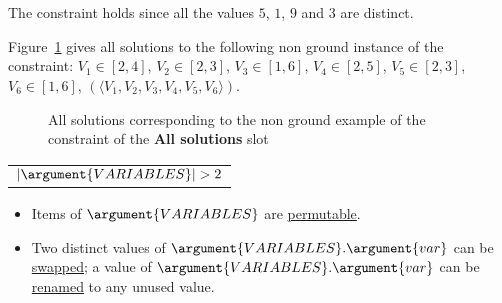 \begin{ctrdesc}
{{{}}}
\\\ \\
The  constraint holds since all the values $5$, $1$, $9$ and $3$
are distinct.

\item[\pdfmarkup{subject={All solutions},color=white,markup=Highlight}{All solutions}{Example of all solutions for a non ground instance of the constraint.}]
Figure~\ref{fig:alldifferent0} gives all solutions to the following non ground instance of the  constraint:
$V_1\in [2,4]$, $V_2\in [2,3]$, $V_3\in [1,6]$, $V_4\in [2,5]$, $V_5\in [2,3]$, $V_6\in [1,6]$,
$(\langle V_1,V_2,V_3,V_4,V_5,V_6\rangle)$.
\begin{figure}[!h]
\centering
{\small
{}
\caption{\label{fig:alldifferent0}
All solutions corresponding to the non ground example of the  constraint of the {\bf All solutions} slot}
}
\end{figure}

\item[\pdfmarkup{subject={Typical},color=white,markup=Highlight}{Typical}{Typical condition on the arguments of the constraint.}]
\colorbox{MyAzurelight}{\begin{minipage}[t]{11.2cm}
\begin{tabular}[t]{l}
$|\argument{VARIABLES}|>2$\\
\end{tabular}

\end{minipage}}
\item[\pdfmarkup{subject={Symmetries},color=white,markup=Highlight}{Symmetries}{List of mappings (e.g., permutation of arguments, permutation of items, permutation of attributes, permutation of values, translation of attributes) that preserve the solutions of the constraint.}]
\colorbox{MyAzurelight}{\begin{minipage}[t]{11.2cm}
\begin{itemize}
\item
Items of $\argument{VARIABLES}$ are \hyperlink{AS_items}{permutable}.
\item
Two distinct values of $\argument{VARIABLES}.\argument{var}$ can be \hyperlink{AS_vals}{swapped}; a value of $\argument{VARIABLES}.\argument{var}$ can be \hyperlink{AS_vals}{renamed} to any unused value.
\end{itemize}


\end{minipage}}
\end{ctrdesc}
